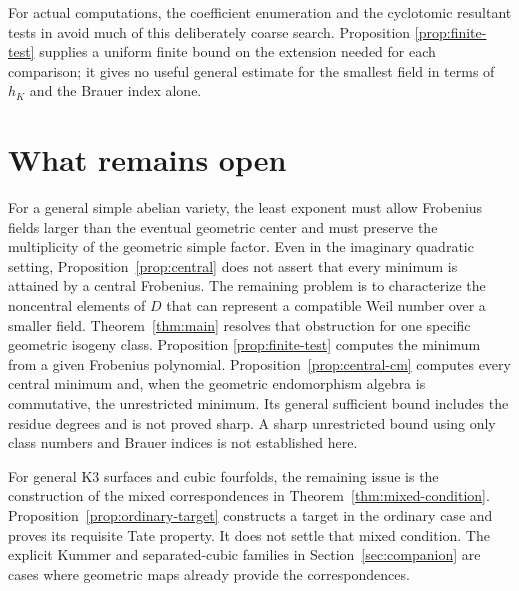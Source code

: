 \documentclass[11pt,a4paper]{article}
\theoremstyle{definition}
\theoremstyle{remark}
\begin{document}
For actual computations, the coefficient enumeration and the
cyclotomic resultant tests in \citet[\S\S3.1 and 3.4]{DKRV2020}
avoid much of this deliberately coarse search. Proposition
\ref{prop:finite-test} supplies a uniform finite bound on the
extension needed for each comparison; it gives no useful general
estimate for the smallest field in terms of $h_K$ and the Brauer
index alone.



\section{What remains open}

For a general simple abelian variety, the least exponent must allow
Frobenius fields larger than the eventual geometric center and must
preserve the multiplicity of the geometric simple factor. Even in
the imaginary quadratic setting, Proposition~\ref{prop:central}
does not assert that every minimum is attained by a central
Frobenius. The remaining problem is to characterize the noncentral
elements of $D$ that can represent a compatible Weil number over a
smaller field. Theorem~\ref{thm:main} resolves that obstruction for
one specific geometric isogeny class. Proposition
\ref{prop:finite-test} computes the minimum from a given Frobenius
polynomial. Proposition~\ref{prop:central-cm} computes every
central minimum and, when the geometric endomorphism algebra is
commutative, the unrestricted minimum. Its general sufficient
bound includes the residue degrees and is not proved sharp. A
sharp unrestricted bound using only class numbers and Brauer
indices is not established here.

For general K3 surfaces and cubic fourfolds, the remaining issue is
the construction of the mixed correspondences in
Theorem~\ref{thm:mixed-condition}. Proposition~\ref{prop:ordinary-target}
constructs a target in the ordinary case and proves its requisite
Tate property. It does not settle that mixed condition. The explicit
Kummer and separated-cubic families in Section~\ref{sec:companion}
are cases where geometric maps already provide the correspondences.
\end{document}
